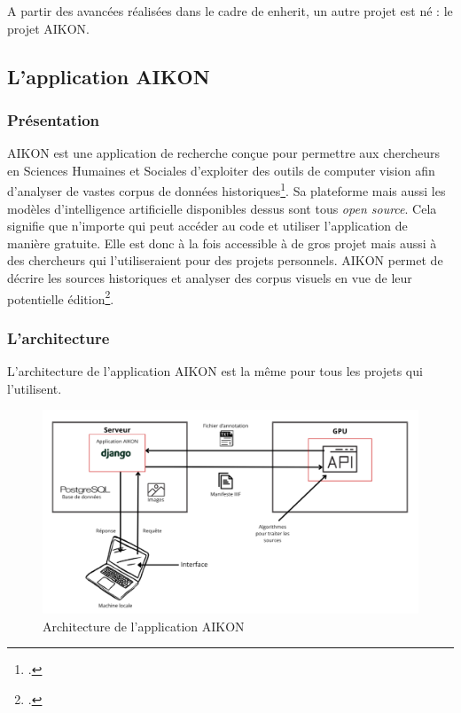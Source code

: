 A partir des avancées réalisées dans le cadre de \gls{enherit}, un autre projet est né : le projet AIKON.

\subsection{L'application AIKON}

\subsubsection{Présentation}
AIKON est une application de recherche conçue pour permettre aux chercheurs en Sciences Humaines et Sociales d'exploiter des outils de computer vision afin d'analyser de vastes corpus de données historiques\footcite{aikonAikonplatformAikon2025}. 
Sa plateforme mais aussi les modèles d'intelligence artificielle disponibles dessus sont tous \textit{open source}. Cela signifie que n'importe qui peut accéder au code et utiliser l'application de manière gratuite. Elle est donc à la fois accessible à de gros projet mais aussi à des chercheurs qui l'utiliseraient pour des projets personnels. 
AIKON permet de décrire les sources historiques et analyser des corpus visuels en vue de leur potentielle édition\footcite{albouyAIKONComputerVision}.

\subsubsection{L'architecture}

L'architecture de l'application AIKON est la même pour tous les projets qui l'utilisent.

\begin{figure}[H]
	\centering
	\includegraphics[width=1\textwidth]{images/architecture_aikon.png}
	\caption{Architecture de l'application AIKON}
	\label{fig:architecture_aikon}
\end{figure}

